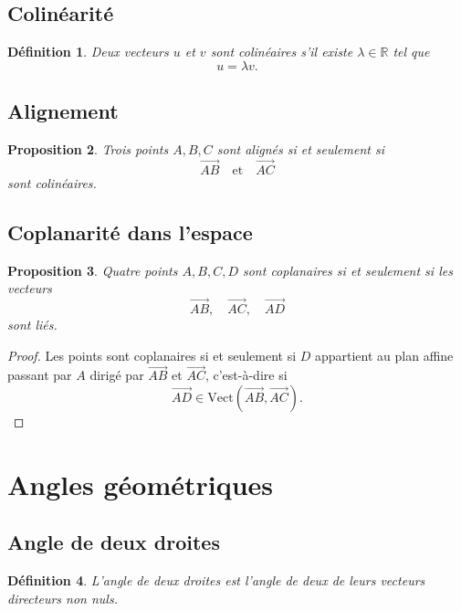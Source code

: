\documentclass[11pt,a4paper]{article}
\newtheorem{definition}{Définition}[section]
\newtheorem{proposition}[definition]{Proposition}
\theoremstyle{remark}
\newcommand{\R}{\mathbb{R}}
\newcommand{\Vect}{\mathrm{Vect}}
\begin{document}
\subsection{Colinéarité}

\begin{definition}
Deux vecteurs \(u\) et \(v\) sont colinéaires s’il existe \(\lambda\in\R\) tel que
\[
u=\lambda v.
\]
\end{definition}

\subsection{Alignement}

\begin{proposition}
Trois points \(A,B,C\) sont alignés si et seulement si
\[
\overrightarrow{AB}
\quad \text{et} \quad
\overrightarrow{AC}
\]
sont colinéaires.
\end{proposition}

\subsection{Coplanarité dans l’espace}

\begin{proposition}
Quatre points \(A,B,C,D\) sont coplanaires si et seulement si les vecteurs
\[
\overrightarrow{AB},\quad \overrightarrow{AC},\quad \overrightarrow{AD}
\]
sont liés.
\end{proposition}

\begin{proof}
Les points sont coplanaires si et seulement si \(D\) appartient au plan affine passant par \(A\) dirigé par \(\overrightarrow{AB}\) et \(\overrightarrow{AC}\), c’est-à-dire si
\[
\overrightarrow{AD}\in \Vect(\overrightarrow{AB},\overrightarrow{AC}).
\]
\end{proof}

\section{Angles géométriques}

\subsection{Angle de deux droites}

\begin{definition}
L’angle de deux droites est l’angle de deux de leurs vecteurs directeurs non nuls.
\end{definition}
\end{document}
